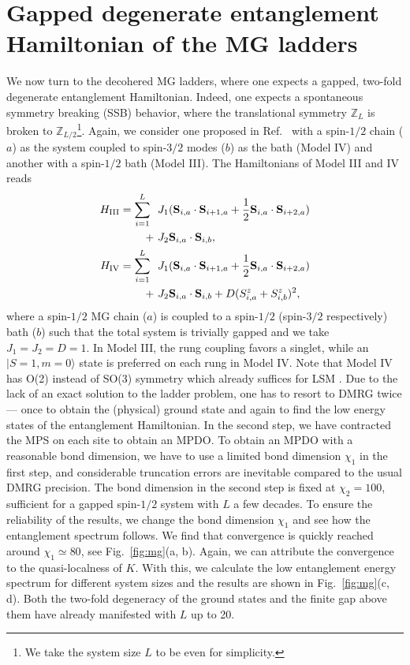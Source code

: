 \documentclass[twocolumn,aps,prb,english]{revtex4-2}
\begin{document}
\section{Gapped degenerate entanglement Hamiltonian of the MG ladders}
We now turn to the decohered MG ladders, where one expects a gapped, two-fold degenerate entanglement Hamiltonian. Indeed, one expects a spontaneous symmetry breaking (SSB) behavior, where the translational symmetry $\mathbb{Z}_L$ is broken to $\mathbb{Z}_{L/2}$\footnote{We take the system size $L$ to be even for simplicity.}. Again, we consider one proposed in Ref.~\cite{zhou2023} with a spin-$1/2$ chain ($a$) as the system coupled to spin-$3/2$ modes ($b$) as the bath (Model IV) and another with a spin-$1/2$ bath (Model III). The Hamiltonians of Model III and IV reads
\begin{align}
{H}_\mathrm{III}=\sum_{i=1}^L ~~&J_1({\bf {S}}_{i,a}\cdot {\bf S}_{i+1,a}+\frac{1}{2}{\bf {S}}_{i,a}\cdot {\bf {S}}_{i+2,a})\nonumber\\
+ ~&J_2 {\bf {S}}_{i,a}\cdot {\bf {S}}_{i,b},\\
{H}_\mathrm{IV}=\sum_{i=1}^L ~~&J_1({\bf {S}}_{i,a}\cdot {\bf S}_{i+1,a}+\frac{1}{2}{\bf {S}}_{i,a}\cdot {\bf {S}}_{i+2,a})\nonumber\\
+ ~&J_2 {\bf {S}}_{i,a}\cdot {\bf {S}}_{i,b}+D({S}_{i,a}^z+{S}_{i,b}^z)^2,         
\end{align}
where a spin-$1/2$ MG chain ($a$) \cite{Majumdar1969} is coupled to a spin-$1/2$ (spin-$3/2$ respectively) bath ($b$) such that the total system is trivially gapped and we take $J_1=J_2=D=1$. In Model III, the rung coupling favors a singlet, while an $|S=1,m=0\rangle$ state is preferred on each rung in Model IV. Note that Model IV has O(2) instead of SO(3) symmetry which already suffices for LSM \cite{Affleck1986}. Due to the lack of an exact solution to the ladder problem, one has to resort to DMRG twice --- once to obtain the (physical) ground state and again to find the low energy states of the entanglement Hamiltonian. In the second step, we have contracted the MPS on each site to obtain an MPDO. To obtain an MPDO with a reasonable bond dimension, we have to use a limited bond dimension $\chi_1$ in the first step, and considerable truncation errors are inevitable compared to the usual DMRG precision. The bond dimension in the second step is fixed at $\chi_2=100$, sufficient for a gapped spin-$1/2$ system with $L$ a few decades. To ensure the reliability of the results, we change the bond dimension $\chi_1$ and see how the entanglement spectrum follows. We find that convergence is quickly reached around $\chi_1\simeq 80$, see Fig.~\ref{fig:mg}(a, b). Again, we can attribute the convergence to the quasi-localness of $K$. With this, we calculate the low entanglement energy spectrum for different system sizes and the results are shown in Fig.~\ref{fig:mg}(c, d). Both the two-fold degeneracy of the ground states and the finite gap above them have already manifested with $L$ up to 20.
\end{document}
